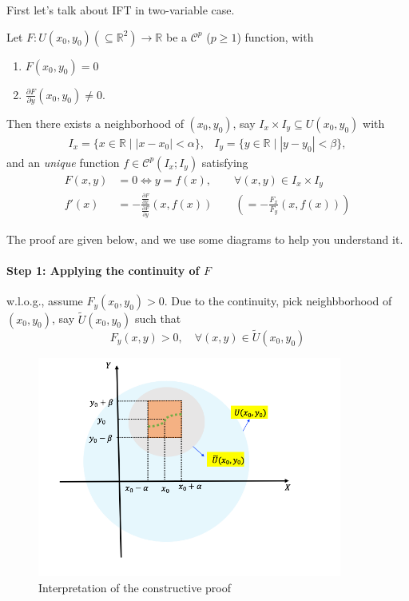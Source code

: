 First let's talk about IFT in two-variable case.
\begin{theorem}\label{The:11:2}
Let $F: U(x_0,y_0)(\subseteq\mathbb{R}^2)\to\mathbb{R}$ be a $\mathcal{C}^p$ ($p\ge1$) function, with
\begin{enumerate}
\item
$F(x_0,y_0)=0$
\item
$\frac{\partial F}{\partial y}(x_0,y_0)\ne0$.
\end{enumerate}
Then there exists a neighborhood of $(x_0,y_0)$, say $I_x\times I_y\subseteq U(x_0,y_0)$ with
\[
\begin{array}{ll}
I_x=\{x\in\mathbb{R}\mid |x-x_0|<\alpha\},
&
I_y=\{y\in\mathbb{R}\mid |y-y_0|<\beta\},
\end{array}
\]
and an \emph{unique} function $f\in\mathcal{C}^p(I_x;I_y)$ satisfying
\begin{align}
F(x,y)&=0\Longleftrightarrow
y=f(x),\qquad
\forall (x,y)\in I_x\times I_y\label{Eq:11:2}\\
f'(x)&=-\frac{\frac{\partial F}{\partial x}}{\frac{\partial F}{\partial y}}(x,f(x))\qquad (=-\frac{F_x}{F_y}(x,f(x)))\label{Eq:11:3}
\end{align}
\end{theorem}
The proof are given below, and we use some diagrams to help you understand it.
\paragraph{Step 1: Applying the continuity of $F$}
w.l.o.g., assume $F_y(x_0,y_0)>0$. Due to the continuity, pick neighbborhood of $(x_0,y_0)$, say $\tilde U(x_0,y_0)$ such that
\begin{equation}
F_y(x,y)>0,\quad
\forall (x,y)\in\tilde U(x_0,y_0)
\end{equation}
\begin{figure}
\centering
\includegraphics[width=10cm]{week11/F_11_2}
\caption{Interpretation of the constructive proof}
\end{figure}


